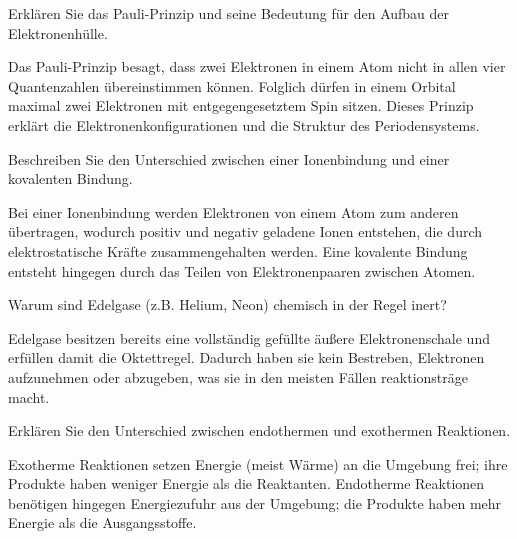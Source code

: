 \begin{exercise}[subtitle=Pauli-Prinzip, points=1, Punkt=1]
Erklären Sie das Pauli-Prinzip und seine Bedeutung für den Aufbau der Elektronenhülle.
\begin{solution}
Das Pauli-Prinzip besagt, dass zwei Elektronen in einem Atom nicht in allen vier Quantenzahlen übereinstimmen können. Folglich dürfen in einem Orbital maximal zwei Elektronen mit entgegengesetztem Spin sitzen. Dieses Prinzip erklärt die Elektronenkonfigurationen und die Struktur des Periodensystems.
\end{solution}
\end{exercise}

\begin{exercise}[subtitle=Bindungsarten, points=1, Punkt=1]
Beschreiben Sie den Unterschied zwischen einer Ionenbindung und einer kovalenten Bindung.
\begin{solution}
Bei einer Ionenbindung werden Elektronen von einem Atom zum anderen übertragen, wodurch positiv und negativ geladene Ionen entstehen, die durch elektrostatische Kräfte zusammengehalten werden. Eine kovalente Bindung entsteht hingegen durch das Teilen von Elektronenpaaren zwischen Atomen.
\end{solution}
\end{exercise}

\begin{exercise}[subtitle=Edelgase, points=1, Punkt=1]
Warum sind Edelgase (z.B. Helium, Neon) chemisch in der Regel inert?
\begin{solution}
Edelgase besitzen bereits eine vollständig gefüllte äußere Elektronenschale und erfüllen damit die Oktettregel. Dadurch haben sie kein Bestreben, Elektronen aufzunehmen oder abzugeben, was sie in den meisten Fällen reaktionsträge macht.
\end{solution}
\end{exercise}

\begin{exercise}[subtitle=Endotherm vs. exotherm, points=1, Punkt=1]
Erklären Sie den Unterschied zwischen endothermen und exothermen Reaktionen.
\begin{solution}
Exotherme Reaktionen setzen Energie (meist Wärme) an die Umgebung frei; ihre Produkte haben weniger Energie als die Reaktanten. Endotherme Reaktionen benötigen hingegen Energiezufuhr aus der Umgebung; die Produkte haben mehr Energie als die Ausgangsstoffe.
\end{solution}
\end{exercise}

